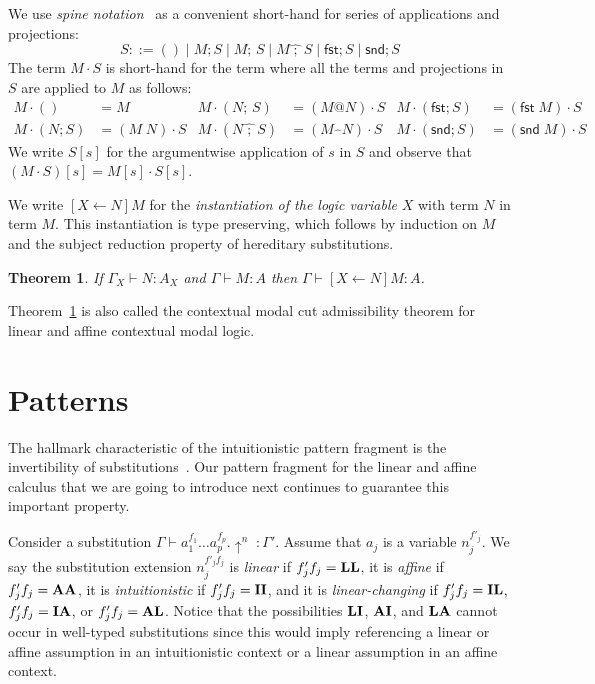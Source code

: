 \documentclass{eptcs}
\makeatletter
\newcommand{\lhat}[1]{\widehat{\;#1\;}}
\newcommand\affapp{{@}}
\newcommand\affext{\mathring{;}\,}
\newcommand\fI{\textup{$\mathbf{I}$}}
\newcommand\fA{\textup{$\mathbf{A}$}}
\newcommand\fL{\textup{$\mathbf{L}$}}
\newtheorem{thm}{Theorem}[section]
\theoremstyle{definition}
\makeatother
\begin{document}
We use \emph{spine notation}~\cite{Cervesato03jlc} as a convenient short-hand for series of
applications and projections:
\[
S::= () \mid M;S \mid M\affext S \mid M\lhat{;}S \mid \textsf{fst};S \mid
\textsf{snd};S
\]
The term $M\cdot S$ is short-hand for the term where all the terms and
projections in $S$ are applied to $M$ as follows:
\begin{align*}
M\cdot () &= M & M\cdot (N\affext S) &= (M\affapp N)\cdot S &
  M\cdot (\textsf{fst};S) &= (\textsf{fst}\;M)\cdot S \\
M\cdot (N;S) &= (M\;N)\cdot S & M\cdot (N\lhat{;}S) &= (M\lhat{}N)\cdot S &
  M\cdot (\textsf{snd};S) &= (\textsf{snd}\;M)\cdot S
\end{align*}
We write $S[s]$ for the argumentwise application of $s$ in $S$ and observe
that $(M\cdot S)[s] = M[s]\cdot S[s]$.

We write $[X\leftarrow N]M$ for the \emph{instantiation of the logic variable} $X$ with term $N$ in
term $M$.  This instantiation is type preserving, which follows 
by induction on $M$ and the subject reduction property of hereditary substitutions.
\begin{thm}\label{thm:modalcut}
If $\Gamma_X\vdash N: A_X$ and $\Gamma\vdash M:A$ then
$\Gamma\vdash [X\leftarrow N]M:A$.
\end{thm}
Theorem~\ref{thm:modalcut} is also called the contextual modal cut
admissibility theorem for linear and affine contextual modal logic.


\section{Patterns}\label{sec:inversion}
The hallmark characteristic of the intuitionistic pattern fragment is
the invertibility of substitutions~\cite{Dowek98tr}.  Our pattern
fragment for the linear and affine calculus that we are going to
introduce next continues to guarantee this important property.  


Consider a substitution
$\Gamma\vdash a_1^{f_1}\ldots a_p^{f_p}.\uparrow^n\;:\Gamma'$.
Assume that $a_j$ is a variable $n_j^{f'_j}$.  We say the
substitution extension
$n_j^{f'_j f_j}$ is
\emph{linear} if
$f'_j f_j={\fL\fL}$, it is \emph{affine} if 
$f'_j f_j={\fA\fA}$, it is \emph{intuitionistic} if 
$f'_j f_j={\fI\fI}$, and it is \emph{linear-changing} if 
$f'_j f_j={\fI\fL}$, $f'_j f_j={\fI\fA}$, or $f'_j f_j={\fA\fL}$.
Notice that the possibilities $\fL\fI$, $\fA\fI$, and $\fL\fA$
cannot occur in well-typed substitutions since this would imply
referencing a linear or affine assumption in an intuitionistic context or
a linear assumption in an affine context.
\end{document}
